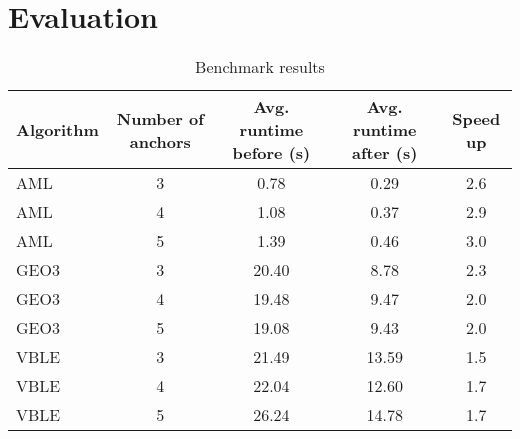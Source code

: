 \section{Evaluation}
\label{Evaluation}

\begin{table}[h]
\begin{center}
\begin{tabular}{lcccc} 
\toprule
Algorithm & Number of anchors & Avg. runtime before (s) & Avg. runtime after (s) & Speed up \\
\midrule
AML & 3 & 0.78 & 0.29 & 2.6 \\
AML & 4 & 1.08 & 0.37 & 2.9 \\
AML & 5 & 1.39 & 0.46 & 3.0 \\
GEO3 & 3 & 20.40 & 8.78 & 2.3 \\ 
GEO3 & 4 & 19.48 & 9.47 & 2.0 \\
GEO3 & 5 & 19.08 & 9.43 & 2.0 \\
VBLE & 3 & 21.49 & 13.59 & 1.5 \\
VBLE & 4 & 22.04 & 12.60 & 1.7 \\
VBLE & 5 & 26.24 & 14.78 & 1.7 \\
\bottomrule
\end{tabular}
\caption{Benchmark results}
\label{eval_table}
\end{center}
\end{table}